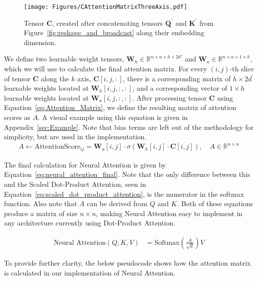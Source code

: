 \documentclass{article}
\begin{document}
\begin{figure}[H]
    \centering
      \texttt{[image: Figures/CAttentionMatrixThreeAxis.pdf]}
    \caption{Tensor $\mathbf{C}$, created after concatenating tensors $\mathbf{Q^{\prime}}$ and $\mathbf{K^{\prime}}$ from Figure~\ref{fig:reshape_and_broadcast} along their embedding dimension.}
    \label{fig:c_tensor}
\end{figure}
We define two learnable weight tensors, $\mathbf{W}_h \in \mathbb{R}^{n \times n \times h \times 2d'}$ and $\mathbf{W}_a \in \mathbb{R}^{n \times n \times 1 \times h}$, which we will use to calculate the final attention matrix. For every $(i,j)$-th slice of tensor $\mathbf{C}$ along the $\mathit{k}$ axis, $\mathbf{C}[i,j,:]$, there is a corresponding matrix of $h \times 2d^{\prime}$ learnable weights located at $\mathbf{W}_h[i,j,:,:]$, and a corresponding vector of $1 \times h$ learnable weights located at $\mathbf{W}_a[i,j,:,:]$. After processing tensor $\mathbf{C}$ using Equation~\ref{eq:Attention_Matrix}, we define the resulting matrix of attention scores as $\mathit{A}$. A visual example using this equation is given in Appendix~\ref{sec:Example}. Note that bias terms are left out of the methodology for simplicity, but are used in the implementation.
 \begin{align}
\mathit{A} \gets \text{AttentionScore}_{ij} = \mathbf{W}_a[i,j] \cdot \sigma(\mathbf{W}_h[i,j] \cdot \mathbf{C}[i,j]), \quad \mathit{A} \in \mathbb{R}^{n \times n} \label{eq:Attention_Matrix}
\end{align}

The final calculation for Neural Attention is given by Equation~\ref{eq:neural_attention_final}. Note that the only difference between this and the Scaled Dot-Product Attention, seen in Equation~\ref{eq:scaled_dot_product_attention}, is the numerator in the softmax function. Also note that $\mathit{A}$ can be derived from $\mathit{Q}$ and $\mathit{K}$. Both of these equations produce a matrix of size $n \times n$, making Neural Attention easy to implement in any architecture currently using Dot-Product Attention.

\begin{align}
    \text{Neural Attention}(Q, K, V) &= \text{Softmax} \left( \frac{A}{\sqrt{d}} \right) V \label{eq:neural_attention_final}
\end{align}

To provide further clarity, the below pseudocode shows how the attention matrix is calculated in our implementation of Neural Attention.
\end{document}
